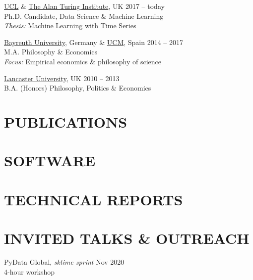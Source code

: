\documentclass{cv}
\newcommand{\printbibsection}[2]{
\begin{refsection}
\nocite{*}
\printbibliography[sorting=chronological,
                  type={#1},
                  title={#2},
                  heading=none]
\end{refsection}
}
\begin{document}
\href{https://www.ucl.ac.uk/}{UCL} \& \href{https://www.turing.ac.uk/}{The Alan Turing Institute}, UK \hfill 2017 -- today \\
Ph.D. Candidate, Data Science \& Machine Learning \\
{\color{lightgray} \emph{Thesis:} Machine Learning with Time Series} %
\vspace{15pt}

\href{https://www.uni-bayreuth.de/en/}{Bayreuth University}, Germany \& \href{https://www.ucm.es/english}{UCM}, Spain \hfill 2014 -- 2017 \\
M.A. Philosophy \& Economics \\
{\color{lightgray} \emph{Focus:} Empirical economics \& philosophy of science}
\vspace{15pt}

\href{https://www.lancs.ac.uk/}{Lancaster University}, UK \hfill 2010 -- 2013 \\
B.A. (Honors) Philosophy, Politics \& Economics \\


\section{PUBLICATIONS}
\printbibsection{article}{}

\section{SOFTWARE}
\printbibsection{misc}{}


\section{TECHNICAL REPORTS}
\printbibsection{proceedings}{}

\section{INVITED TALKS \& OUTREACH}

PyData Global, \textit{sktime sprint} \hfill Nov 2020 \\
{\color{lightgray} 4-hour workshop} \\
\end{document}
